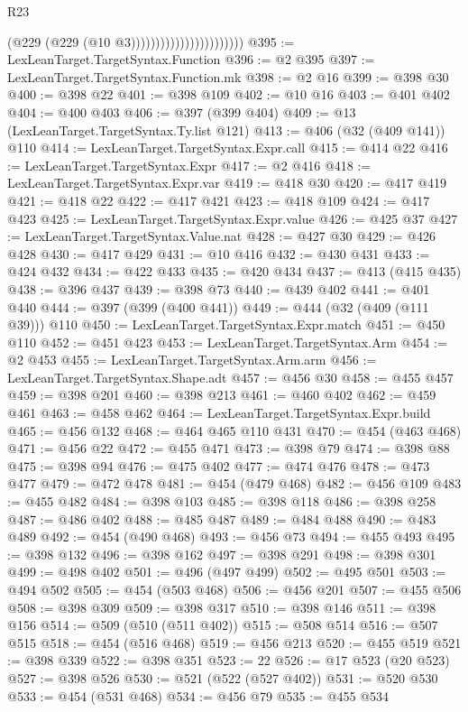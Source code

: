 \begin{lexlean}{R23}
\begin{coremodule}
{{{{{{{{{{{{{{{{{{{{{{{{{{{{{{{{{{{{{{{{{{{{{{{{{{{{{{{{{{{{{{{{{{{{{{{{{{{{{{{{{{{{{{{{{{{{{                                            (@229 (@229 (@10 @3)))))))))))))))))))))))
@395 := LexLeanTarget.TargetSyntax.Function
@396 := @2 @395
@397 := LexLeanTarget.TargetSyntax.Function.mk
@398 := @2 @16
@399 := @398 @30
@400 := @398 @22
@401 := @398 @109
@402 := @10 @16
@403 := @401 @402
@404 := @400 @403
@406 := @397 (@399 @404)
@409 := @13 (LexLeanTarget.TargetSyntax.Ty.list @121)
@413 := @406 (@32 (@409 @141)) @110
@414 := LexLeanTarget.TargetSyntax.Expr.call
@415 := @414 @22
@416 := LexLeanTarget.TargetSyntax.Expr
@417 := @2 @416
@418 := LexLeanTarget.TargetSyntax.Expr.var
@419 := @418 @30
@420 := @417 @419
@421 := @418 @22
@422 := @417 @421
@423 := @418 @109
@424 := @417 @423
@425 := LexLeanTarget.TargetSyntax.Expr.value
@426 := @425 @37
@427 := LexLeanTarget.TargetSyntax.Value.nat
@428 := @427 @30
@429 := @426 @428
@430 := @417 @429
@431 := @10 @416
@432 := @430 @431
@433 := @424 @432
@434 := @422 @433
@435 := @420 @434
@437 := @413 (@415 @435)
@438 := @396 @437
@439 := @398 @73
@440 := @439 @402
@441 := @401 @440
@444 := @397 (@399 (@400 @441))
@449 := @444 (@32 (@409 (@111 @39))) @110
@450 := LexLeanTarget.TargetSyntax.Expr.match
@451 := @450 @110
@452 := @451 @423
@453 := LexLeanTarget.TargetSyntax.Arm
@454 := @2 @453
@455 := LexLeanTarget.TargetSyntax.Arm.arm
@456 := LexLeanTarget.TargetSyntax.Shape.adt
@457 := @456 @30
@458 := @455 @457
@459 := @398 @201
@460 := @398 @213
@461 := @460 @402
@462 := @459 @461
@463 := @458 @462
@464 := LexLeanTarget.TargetSyntax.Expr.build
@465 := @456 @132
@468 := @464 @465 @110 @431
@470 := @454 (@463 @468)
@471 := @456 @22
@472 := @455 @471
@473 := @398 @79
@474 := @398 @88
@475 := @398 @94
@476 := @475 @402
@477 := @474 @476
@478 := @473 @477
@479 := @472 @478
@481 := @454 (@479 @468)
@482 := @456 @109
@483 := @455 @482
@484 := @398 @103
@485 := @398 @118
@486 := @398 @258
@487 := @486 @402
@488 := @485 @487
@489 := @484 @488
@490 := @483 @489
@492 := @454 (@490 @468)
@493 := @456 @73
@494 := @455 @493
@495 := @398 @132
@496 := @398 @162
@497 := @398 @291
@498 := @398 @301
@499 := @498 @402
@501 := @496 (@497 @499)
@502 := @495 @501
@503 := @494 @502
@505 := @454 (@503 @468)
@506 := @456 @201
@507 := @455 @506
@508 := @398 @309
@509 := @398 @317
@510 := @398 @146
@511 := @398 @156
@514 := @509 (@510 (@511 @402))
@515 := @508 @514
@516 := @507 @515
@518 := @454 (@516 @468)
@519 := @456 @213
@520 := @455 @519
@521 := @398 @339
@522 := @398 @351
@523 := 22
@526 := @17 @523 (@20 @523)
@527 := @398 @526
@530 := @521 (@522 (@527 @402))
@531 := @520 @530
@533 := @454 (@531 @468)
@534 := @456 @79
@535 := @455 @534
}}}}}}}}}}}}}}}}}}}}}}}}}}}}}}}}}}}}}}}}}}}}}}}}}}}}}}}}}}}}}}}}}}}}}}}}}}}}}}}}}}}}}}}}}}}}}
\end{coremodule}
\end{lexlean}
